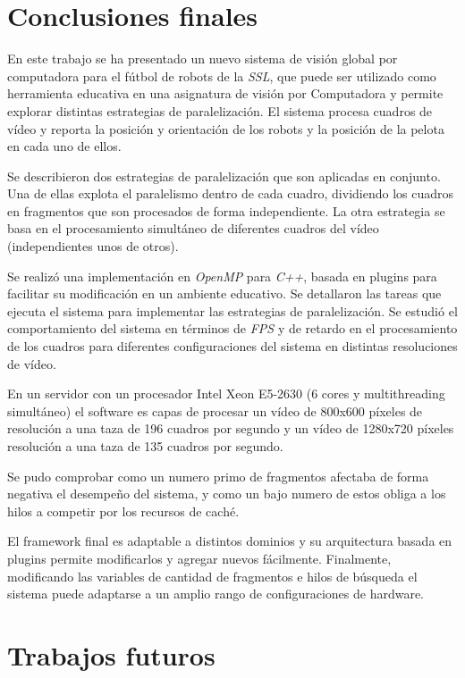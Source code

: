 
\section{Conclusiones finales}

En este trabajo se ha presentado un nuevo sistema de visión global por
computadora para el fútbol de robots de la \emph{SSL}, que puede ser utilizado
como herramienta educativa en una asignatura de visión por Computadora y permite
explorar distintas estrategias de paralelización. El sistema procesa cuadros de
vídeo y reporta la posición y orientación de los robots y la posición de la
pelota en cada uno de ellos.

Se describieron dos estrategias de paralelización que son aplicadas en conjunto.
Una de ellas explota el paralelismo dentro de cada cuadro, dividiendo los
cuadros en fragmentos que son procesados de forma independiente. La otra
estrategia se basa en el procesamiento simultáneo de diferentes cuadros del
vídeo (independientes unos de otros).

Se realizó una implementación en \emph{OpenMP} para \emph{C++}, basada en
plugins para facilitar su modificación en un ambiente educativo. Se detallaron
las tareas que ejecuta el sistema para implementar las estrategias de
paralelización. Se estudió el comportamiento del sistema en términos de
\emph{FPS} y de retardo en el procesamiento de los cuadros para diferentes
configuraciones del sistema en distintas resoluciones de vídeo.

En un servidor con un procesador Intel Xeon E5-2630 (6 cores y multithreading
simultáneo) el software es capas de procesar un vídeo de 800x600 píxeles de
resolución a una taza de 196 cuadros por segundo y un vídeo de 1280x720 píxeles
resolución a una taza de 135 cuadros por segundo.

Se pudo comprobar como un numero primo de fragmentos afectaba de forma negativa
el desempeño del sistema, y como un bajo numero de estos obliga a los hilos a
competir por los recursos de caché.

El framework final es adaptable a distintos dominios y su arquitectura basada en
plugins permite modificarlos y agregar nuevos fácilmente. Finalmente,
modificando las variables de cantidad de fragmentos e hilos de búsqueda el
sistema puede adaptarse a un amplio rango de configuraciones de hardware.

\section{Trabajos futuros}

